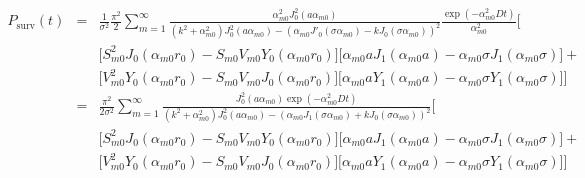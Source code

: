 \documentclass{article}
\begin{document}
\begin{eqnarray}
    P_{\mathrm{surv}}(t)
        &=& \frac{1}{\sigma^2} \frac{\pi^2}{2}\sum_{m=1}^{\infty}
            \frac{\alpha_{m0}^2 J^2_0(a\alpha_{m0})}{(k^2 + \alpha_{m0}^2) J_0^2(a\alpha_{m0}) - (\alpha_{m0}J'_0(\sigma\alpha_{m0}) - kJ_0(\sigma\alpha_{m0}))^2}
            \frac{\exp(-\alpha_{m0}^2Dt)}{\alpha_{m0}^2}\Bigg[\nonumber\\
        & & \Big[S_{m0}^2 J_0(\alpha_{m0} r_0) - S_{m0}V_{m0} Y_0(\alpha_{m0} r_0) \Big]\Big[\alpha_{m0}a J_1(\alpha_{m0}a) - \alpha_{m0}\sigma J_1(\alpha_{m0}\sigma) \Big] + \nonumber\\
        & & \Big[V_{m0}^2 Y_0(\alpha_{m0} r_0) - S_{m0}V_{m0} J_0(\alpha_{m0} r_0) \Big]\Big[\alpha_{m0}a Y_1(\alpha_{m0}a) - \alpha_{m0}\sigma Y_1(\alpha_{m0}\sigma) \Big]\Bigg]\nonumber\\
        &=& \frac{\pi^2}{2\sigma^2} \sum_{m=1}^{\infty}
            \frac{J^2_0(a\alpha_{m0}) \exp(-\alpha_{m0}^2Dt)}{(k^2 + \alpha_{m0}^2) J_0^2(a\alpha_{m0}) - (\alpha_{m0}J_1(\sigma\alpha_{m0}) + kJ_0(\sigma\alpha_{m0}))^2}
            \Bigg[\nonumber\\
        & & \Big[S_{m0}^2 J_0(\alpha_{m0} r_0) - S_{m0}V_{m0} Y_0(\alpha_{m0} r_0) \Big]\Big[\alpha_{m0}a J_1(\alpha_{m0}a) - \alpha_{m0}\sigma J_1(\alpha_{m0}\sigma) \Big] + \nonumber\\
        & & \Big[V_{m0}^2 Y_0(\alpha_{m0} r_0) - S_{m0}V_{m0} J_0(\alpha_{m0} r_0) \Big]\Big[\alpha_{m0}a Y_1(\alpha_{m0}a) - \alpha_{m0}\sigma Y_1(\alpha_{m0}\sigma) \Big]\Bigg]\nonumber
\end{eqnarray}



\end{document}
